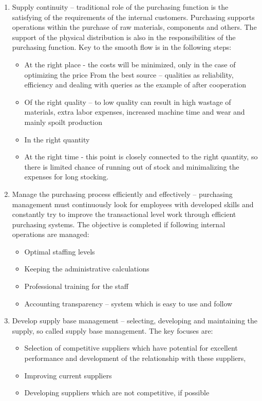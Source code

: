 \documentclass[oneside,12pt]{article}%
\begin{document}
\begin{enumerate}
  \item Supply continuity – traditional role of the purchasing function is the satisfying of the requirements of the internal customers. Purchasing supports operations within the purchase of raw materials, components and others. The support of the physical distribution is also in the responsibilities of the purchasing function. Key to the smooth flow is in the following  steps:
  \begin{itemize}
    \item   At the right place - the costs will be minimized, only in the case of optimizing the price
    From the best source – qualities as reliability, efficiency and dealing with queries as the example of after cooperation
    \item Of the right quality – to low quality can result in high wastage of materials, extra labor expenses, increased machine time and wear and mainly spoilt production
    \item In the right quantity
    \item At the right time - this point is closely connected to the right quantity, so there is limited chance of running out of stock and minimalizing the expenses for long stocking.
  \end{itemize}



  \item Manage the purchasing process efficiently and effectively – purchasing management must continuously look for employees with developed skills and constantly try to improve the transactional level work through efficient purchasing systems. The objective is completed if following internal operations are managed:
    \begin{itemize}
    \item Optimal staffing levels
    \item Keeping the administrative calculations
    \item Professional training for the staff
    \item Accounting transparency – system which is easy to use and follow
    \end{itemize}


  \item Develop supply base management – selecting, developing and maintaining the supply, so called supply base management. The key focuses are:
  \begin{itemize}
    \item Selection of competitive suppliers which have potential for excellent performance and development of the relationship with these suppliers,
    \item Improving current suppliers
    \item Developing suppliers which are not competitive, if possible
  \end{itemize}


\end{enumerate}
\end{document}
